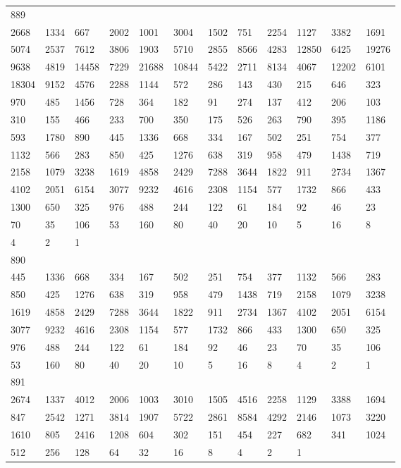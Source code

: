 \begin{longtable}{llllllllllll}
889&&&&&&&&&&&\\
2668& 1334& 667& 2002& 1001& 3004& 1502& 751& 2254& 1127& 3382& 1691\\
5074& 2537& 7612& 3806& 1903& 5710& 2855& 8566& 4283& 12850& 6425& 19276\\
9638& 4819& 14458& 7229& 21688& 10844& 5422& 2711& 8134& 4067& 12202& 6101\\
18304& 9152& 4576& 2288& 1144& 572& 286& 143& 430& 215& 646& 323\\
970& 485& 1456& 728& 364& 182& 91& 274& 137& 412& 206& 103\\
310& 155& 466& 233& 700& 350& 175& 526& 263& 790& 395& 1186\\
593& 1780& 890& 445& 1336& 668& 334& 167& 502& 251& 754& 377\\
1132& 566& 283& 850& 425& 1276& 638& 319& 958& 479& 1438& 719\\
2158& 1079& 3238& 1619& 4858& 2429& 7288& 3644& 1822& 911& 2734& 1367\\
4102& 2051& 6154& 3077& 9232& 4616& 2308& 1154& 577& 1732& 866& 433\\
1300& 650& 325& 976& 488& 244& 122& 61& 184& 92& 46& 23\\
70& 35& 106& 53& 160& 80& 40& 20& 10& 5& 16& 8\\
4& 2& 1& \\

890&&&&&&&&&&&\\
445& 1336& 668& 334& 167& 502& 251& 754& 377& 1132& 566& 283\\
850& 425& 1276& 638& 319& 958& 479& 1438& 719& 2158& 1079& 3238\\
1619& 4858& 2429& 7288& 3644& 1822& 911& 2734& 1367& 4102& 2051& 6154\\
3077& 9232& 4616& 2308& 1154& 577& 1732& 866& 433& 1300& 650& 325\\
976& 488& 244& 122& 61& 184& 92& 46& 23& 70& 35& 106\\
53& 160& 80& 40& 20& 10& 5& 16& 8& 4& 2& 1\\

891&&&&&&&&&&&\\
2674& 1337& 4012& 2006& 1003& 3010& 1505& 4516& 2258& 1129& 3388& 1694\\
847& 2542& 1271& 3814& 1907& 5722& 2861& 8584& 4292& 2146& 1073& 3220\\
1610& 805& 2416& 1208& 604& 302& 151& 454& 227& 682& 341& 1024\\
512& 256& 128& 64& 32& 16& 8& 4& 2& 1& \\


\end{longtable}
